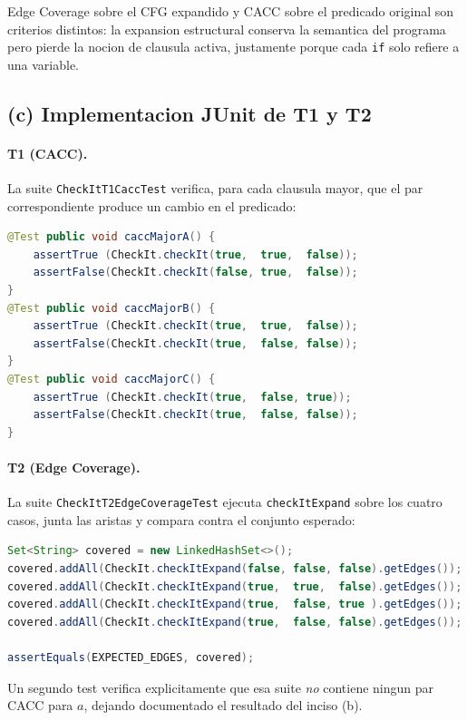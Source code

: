 \documentclass[12pt,a4paper]{article}
\begin{document}
Edge Coverage sobre el CFG expandido y CACC sobre el predicado original son criterios
distintos: la expansion estructural conserva la semantica del programa pero pierde la nocion de
clausula activa, justamente porque cada \texttt{if} solo refiere a una variable.

\subsection{(c) Implementacion JUnit de T1 y T2}

\paragraph{T1 (CACC).} La suite \texttt{CheckItT1CaccTest} verifica, para cada clausula mayor,
que el par correspondiente produce un cambio en el predicado:

\begin{lstlisting}[style=codestyle,language=Java]
@Test public void caccMajorA() {
    assertTrue (CheckIt.checkIt(true,  true,  false));
    assertFalse(CheckIt.checkIt(false, true,  false));
}
@Test public void caccMajorB() {
    assertTrue (CheckIt.checkIt(true,  true,  false));
    assertFalse(CheckIt.checkIt(true,  false, false));
}
@Test public void caccMajorC() {
    assertTrue (CheckIt.checkIt(true,  false, true));
    assertFalse(CheckIt.checkIt(true,  false, false));
}
\end{lstlisting}

\paragraph{T2 (Edge Coverage).} La suite \texttt{CheckItT2EdgeCoverageTest} ejecuta
\texttt{checkItExpand} sobre los cuatro casos, junta las aristas y compara contra el conjunto
esperado:

\begin{lstlisting}[style=codestyle,language=Java]
Set<String> covered = new LinkedHashSet<>();
covered.addAll(CheckIt.checkItExpand(false, false, false).getEdges());
covered.addAll(CheckIt.checkItExpand(true,  true,  false).getEdges());
covered.addAll(CheckIt.checkItExpand(true,  false, true ).getEdges());
covered.addAll(CheckIt.checkItExpand(true,  false, false).getEdges());

assertEquals(EXPECTED_EDGES, covered);
\end{lstlisting}

Un segundo test verifica explicitamente que esa suite \emph{no} contiene ningun par CACC para
$a$, dejando documentado el resultado del inciso (b).
\end{document}
